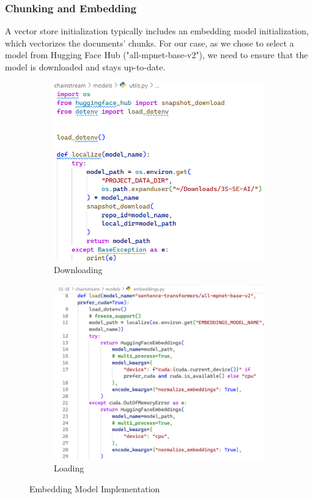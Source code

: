 \subsubsection{Chunking and Embedding}
A vector store initialization typically includes an embedding model initialization, which vectorizes the documents' chunks. For our case, as we chose to select a model from Hugging Face Hub ("all-mpnet-base-v2"), we need to ensure that the model is downloaded and stays up-to-date.
\begin{figure}[H]
    \centering
    \begin{subfigure}{0.45\textwidth}
        \centering
        \includegraphics[width=\linewidth]{./figures/embedding-model-downloading.png}
        \caption{Downloading}
    \end{subfigure}
    \hfill
    \begin{subfigure}{0.45\textwidth}
        \centering
        \includegraphics[width=\linewidth]{./figures/embedding-model-loading.png}
        \caption{Loading}
    \end{subfigure}
    \caption{Embedding Model Implementation}
\end{figure}
